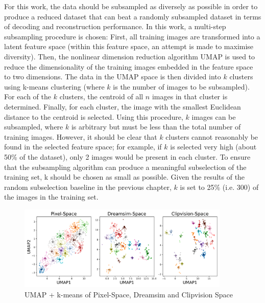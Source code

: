 For this work, the data should be subsampled as diversely as possible in order to produce a reduced dataset that can beat a randomly subsampled dataset in terms of decoding and reconstruction performance. In this work, a multi-step subsampling procedure is chosen: First, all training images are transformed into a latent feature space (within this feature space, an attempt is made to maximise diversity). Then, the nonlinear dimension reduction algorithm UMAP\cite{mcinnesUMAPUniformManifold2018} is used to reduce the dimensionality of the training images embedded in the feature space to two dimensions. The data in the UMAP space is then divided into $k$ clusters using k-means\cite{1056489} clustering (where $k$ is the number of images to be subsampled). For each of the $k$ clusters, the centroid of all $n$ images in that cluster is determined. Finally, for each cluster, the image with the smallest Euclidean distance to the centroid is selected. Using this procedure, $k$ images can be subsampled, where $k$ is arbitrary but must be less than the total number of training images. However, it should be clear that $k$ clusters cannot reasonably be found in the selected feature space; for example, if $k$ is selected very high (about 50\% of the dataset), only 2 images would be present in each cluster. To ensure that the subsampling algorithm can produce a meaningful subselection of the training set, k should be chosen as small as possible. Given the results of the random subselection baseline in the previous chapter, $k$ is set to 25\% (i.e. 300) of the images in the training set. 

\begin{figure}[ht]
    \centering
    \includegraphics[width=0.9\textwidth]{plots/dropout_umap.png}
    \caption{UMAP + k-means of Pixel-Space, Dreamsim and Clipvision Space}\label{fig:dropout_umap}
\end{figure}




